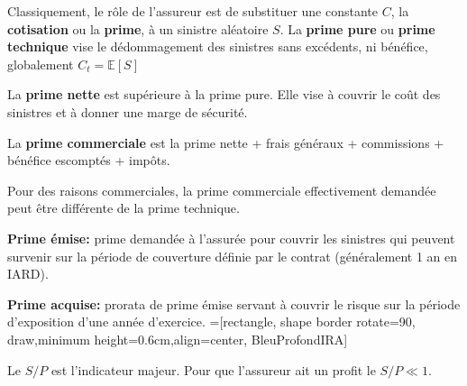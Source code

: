 \begin{f}
Classiquement, le rôle de l'assureur est de substituer une constante $C$, la \textbf{cotisation} ou la \textbf{prime}, à un sinistre aléatoire $S$.
La \textbf{prime pure} ou \textbf{prime technique} vise 
le dédommagement des sinistres sans excédents, ni bénéfice, globalement $C_t = \mathbb{E}[S]$
	
	La \textbf{prime nette} est supérieure à la prime pure. Elle vise à couvrir le coût des sinistres et à donner une marge de sécurité.
	
	La \textbf{prime commerciale} est la prime nette + frais généraux + commissions + bénéfice escomptés + impôts.
	
	Pour des raisons commerciales, la prime commerciale effectivement demandée peut être différente de la prime technique.

	\textbf{Prime émise:} prime demandée à l'assurée pour couvrir les sinistres qui peuvent survenir sur la
période de couverture définie par le contrat (généralement 1 an en IARD).

\textbf{Prime acquise:} prorata de prime émise servant à couvrir le risque sur la période d'exposition
d'une année d'exercice.
=[rectangle, shape border rotate=90, draw,minimum height=0.6cm,align=center, BleuProfondIRA]

\resizebox{\linewidth}{!}
{
}
Le $S/P$ est l'indicateur majeur. Pour que l'assureur ait un profit le $S/P\ll 1$. 
\end{f}

